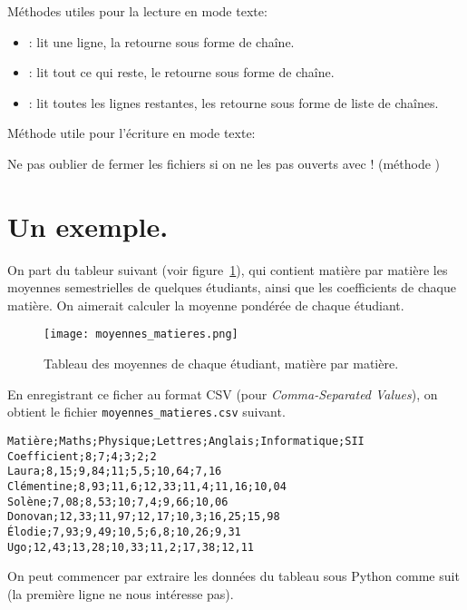 Méthodes utiles pour la lecture en mode texte:
\begin{itemize}
\item {}: lit une ligne, la retourne sous forme de chaîne.
\item {}: lit tout ce qui reste, le retourne sous forme de chaîne.
\item {}: lit toutes les lignes restantes, les retourne
  sous forme de liste de chaînes.
\end{itemize}

Méthode utile pour l'écriture en mode texte: 

Ne pas oublier de fermer les fichiers si on ne les pas ouverts avec
! (méthode )

\section{Un exemple.}

On part du tableur suivant (voir figure~\ref{07:tab:moyennes_matieres}), qui contient matière par matière les moyennes semestrielles de quelques étudiants, ainsi que les coefficients de chaque matière. On aimerait calculer la moyenne pondérée de chaque étudiant. 

\begin{figure}[h!]
    \begin{center}
        \texttt{[image: moyennes\_matieres.png]}
    \end{center}
    \caption{Tableau des moyennes de chaque étudiant, matière par matière.}
    \label{07:tab:moyennes_matieres}
\end{figure}


En enregistrant ce ficher au format CSV (pour \emph{Comma-Separated Values}), on obtient le fichier \texttt{moyennes\_matieres.csv} suivant. 
\begin{verbatim}
Matière;Maths;Physique;Lettres;Anglais;Informatique;SII
Coefficient;8;7;4;3;2;2
Laura;8,15;9,84;11;5,5;10,64;7,16
Clémentine;8,93;11,6;12,33;11,4;11,16;10,04
Solène;7,08;8,53;10;7,4;9,66;10,06
Donovan;12,33;11,97;12,17;10,3;16,25;15,98
Élodie;7,93;9,49;10,5;6,8;10,26;9,31
Ugo;12,43;13,28;10,33;11,2;17,38;12,11
\end{verbatim}


On peut commencer par extraire les données du tableau sous Python{} comme suit (la première ligne ne nous intéresse pas).

